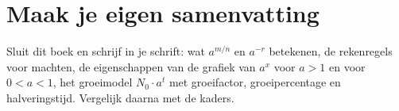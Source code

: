 \ifzelfstudie
\section*{Maak je eigen samenvatting}
Sluit dit boek en schrijf in je schrift: wat $a^{m/n}$ en $a^{-r}$ betekenen, de rekenregels voor machten, de eigenschappen van de grafiek van $a^x$ voor $a > 1$ en voor $0 < a < 1$, het groeimodel $N_0 \cdot a^t$ met groeifactor, groeipercentage en halveringstijd. Vergelijk daarna met de kaders.
\fi

